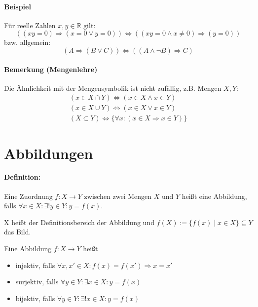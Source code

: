 \documentclass[12pt,a4paper,parskip=half-,DIV=15]{scrreprt}
\begin{document}
\paragraph{Beispiel} Für reelle Zahlen $x,y\in\mathbb{R}$ gilt:
\begin{equation*}
\left((xy = 0)\Rightarrow (x=0 \lor y=0)\right) \Leftrightarrow \left((xy=0 \land x \neq 0)\Rightarrow (y =0)\right)
\end{equation*}
bzw. allgemein:
\begin{equation*}
(A\Rightarrow (B\lor C))\Leftrightarrow ((A\land\lnot B)\Rightarrow C)
\end{equation*}

\paragraph{Bemerkung (Mengenlehre)} Die Ähnlichkeit mit der Mengensymbolik ist nicht zufällig, z.B. Mengen $X, Y$:
\begin{gather*}
(x\in X\cap Y)\Leftrightarrow (x\in X\land x\in Y)\\
(x\in X\cup Y)\Leftrightarrow (x\in X\lor x\in Y)\\
(X\subset Y) \Leftrightarrow \{\forall x : (x\in X \Rightarrow x\in Y)\}
\end{gather*}

\section{Abbildungen}
\paragraph{Definition:} Eine Zuordnung $f: X\to Y$ zwischen zwei Mengen $X$ und $Y$ heißt eine Abbildung, falls $\forall x\in X: \exists ! y\in Y: y=f(x)$.

X heißt der Definitionsbereich der Abbildung und $f(X):=\{f(x)\mid x\in X \}\subseteq Y$ das Bild.

Eine Abbildung $f: X\to Y$ heißt
\begin{itemize}
\item injektiv, falls $\forall x,x'\in X:f(x) = f(x') \Rightarrow x=x'$
\item surjektiv, falls $\forall y\in Y:\exists x\in X: y = f(x)$
\item bijektiv, falls $\forall y\in Y:\exists !x\in X: y = f(x)$
\end{itemize}
\end{document}
